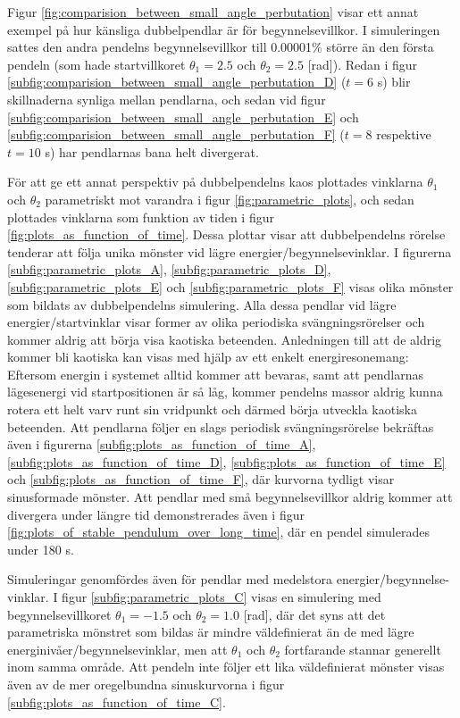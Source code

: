 Figur \ref{fig:comparision_between_small_angle_perbutation} visar ett annat exempel på hur känsliga dubbelpendlar är för begynnelsevillkor. I simuleringen sattes den andra pendelns begynnelsevillkor till 0.00001\% större än den första pendeln (som hade startvillkoret $\theta_1 = 2.5$ och $\theta_2 = 2.5$ [rad]). Redan i figur \ref{subfig:comparision_between_small_angle_perbutation_D} ($t=6$ s) blir skillnaderna synliga mellan pendlarna, och sedan vid figur \ref{subfig:comparision_between_small_angle_perbutation_E} och \ref{subfig:comparision_between_small_angle_perbutation_F} ($t = 8$ respektive $t=10$ s) har pendlarnas bana helt divergerat. 

För att ge ett annat perspektiv på dubbelpendelns kaos plottades vinklarna $\theta_1$ och $\theta_2$ parametriskt mot varandra i figur \ref{fig:parametric_plots}, och sedan plottades vinklarna som funktion av tiden i figur \ref{fig:plots_as_function_of_time}. Dessa plottar visar att dubbelpendelns rörelse tenderar att följa unika mönster vid lägre energier/begynnelsevinklar. I figurerna \ref{subfig:parametric_plots_A}, \ref{subfig:parametric_plots_D}, \ref{subfig:parametric_plots_E} och \ref{subfig:parametric_plots_F} visas olika mönster som bildats av dubbelpendelns simulering. Alla dessa pendlar vid lägre energier/startvinklar visar former av olika periodiska svängningsrörelser och kommer aldrig att börja visa kaotiska beteenden. Anledningen till att de aldrig kommer bli kaotiska kan visas med hjälp av ett enkelt energiresonemang: Eftersom energin i systemet alltid kommer att bevaras, samt att pendlarnas lägesenergi vid startpositionen är så låg, kommer pendelns massor aldrig kunna rotera ett helt varv runt sin vridpunkt och därmed börja utveckla kaotiska beteenden. Att pendlarna följer en slags periodisk svängningsrörelse bekräftas även i figurerna \ref{subfig:plots_as_function_of_time_A}, \ref{subfig:plots_as_function_of_time_D}, \ref{subfig:plots_as_function_of_time_E} och \ref{subfig:plots_as_function_of_time_F}, där kurvorna tydligt visar sinusformade mönster. Att pendlar med små begynnelsevillkor aldrig kommer att divergera under längre tid demonstrerades även i figur \ref{fig:plots_of_stable_pendulum_over_long_time}, där en pendel simulerades under 180 s.   

Simuleringar genomfördes även för pendlar med medelstora energier/begynnelse-vinklar. I figur \ref{subfig:parametric_plots_C} visas en simulering med begynnelsevillkoret $\theta_1 = -1.5$ och $\theta_2 = 1.0$ [rad], där det syns att det parametriska mönstret som bildas är mindre väldefinierat än de med lägre energinivåer/begynnelsevinklar, men att $\theta_1$ och $\theta_2$ fortfarande stannar generellt inom samma område. Att pendeln inte följer ett lika väldefinierat mönster visas även av de mer oregelbundna sinuskurvorna i figur \ref{subfig:plots_as_function_of_time_C}.

